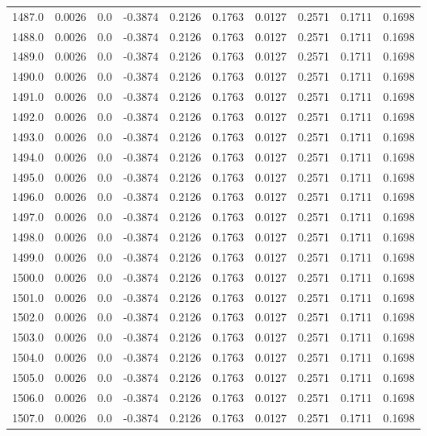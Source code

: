 \begin{longtable}{lrrrrrrrrr}
1487.0 & 0.0026 & 0.0 & -0.3874 & 0.2126 & 0.1763 & 0.0127 & 0.2571 & 0.1711 & 0.1698 \\
1488.0 & 0.0026 & 0.0 & -0.3874 & 0.2126 & 0.1763 & 0.0127 & 0.2571 & 0.1711 & 0.1698 \\
1489.0 & 0.0026 & 0.0 & -0.3874 & 0.2126 & 0.1763 & 0.0127 & 0.2571 & 0.1711 & 0.1698 \\
1490.0 & 0.0026 & 0.0 & -0.3874 & 0.2126 & 0.1763 & 0.0127 & 0.2571 & 0.1711 & 0.1698 \\
1491.0 & 0.0026 & 0.0 & -0.3874 & 0.2126 & 0.1763 & 0.0127 & 0.2571 & 0.1711 & 0.1698 \\
1492.0 & 0.0026 & 0.0 & -0.3874 & 0.2126 & 0.1763 & 0.0127 & 0.2571 & 0.1711 & 0.1698 \\
1493.0 & 0.0026 & 0.0 & -0.3874 & 0.2126 & 0.1763 & 0.0127 & 0.2571 & 0.1711 & 0.1698 \\
1494.0 & 0.0026 & 0.0 & -0.3874 & 0.2126 & 0.1763 & 0.0127 & 0.2571 & 0.1711 & 0.1698 \\
1495.0 & 0.0026 & 0.0 & -0.3874 & 0.2126 & 0.1763 & 0.0127 & 0.2571 & 0.1711 & 0.1698 \\
1496.0 & 0.0026 & 0.0 & -0.3874 & 0.2126 & 0.1763 & 0.0127 & 0.2571 & 0.1711 & 0.1698 \\
1497.0 & 0.0026 & 0.0 & -0.3874 & 0.2126 & 0.1763 & 0.0127 & 0.2571 & 0.1711 & 0.1698 \\
1498.0 & 0.0026 & 0.0 & -0.3874 & 0.2126 & 0.1763 & 0.0127 & 0.2571 & 0.1711 & 0.1698 \\
1499.0 & 0.0026 & 0.0 & -0.3874 & 0.2126 & 0.1763 & 0.0127 & 0.2571 & 0.1711 & 0.1698 \\
1500.0 & 0.0026 & 0.0 & -0.3874 & 0.2126 & 0.1763 & 0.0127 & 0.2571 & 0.1711 & 0.1698 \\
1501.0 & 0.0026 & 0.0 & -0.3874 & 0.2126 & 0.1763 & 0.0127 & 0.2571 & 0.1711 & 0.1698 \\
1502.0 & 0.0026 & 0.0 & -0.3874 & 0.2126 & 0.1763 & 0.0127 & 0.2571 & 0.1711 & 0.1698 \\
1503.0 & 0.0026 & 0.0 & -0.3874 & 0.2126 & 0.1763 & 0.0127 & 0.2571 & 0.1711 & 0.1698 \\
1504.0 & 0.0026 & 0.0 & -0.3874 & 0.2126 & 0.1763 & 0.0127 & 0.2571 & 0.1711 & 0.1698 \\
1505.0 & 0.0026 & 0.0 & -0.3874 & 0.2126 & 0.1763 & 0.0127 & 0.2571 & 0.1711 & 0.1698 \\
1506.0 & 0.0026 & 0.0 & -0.3874 & 0.2126 & 0.1763 & 0.0127 & 0.2571 & 0.1711 & 0.1698 \\
1507.0 & 0.0026 & 0.0 & -0.3874 & 0.2126 & 0.1763 & 0.0127 & 0.2571 & 0.1711 & 0.1698 \\

\end{longtable}
